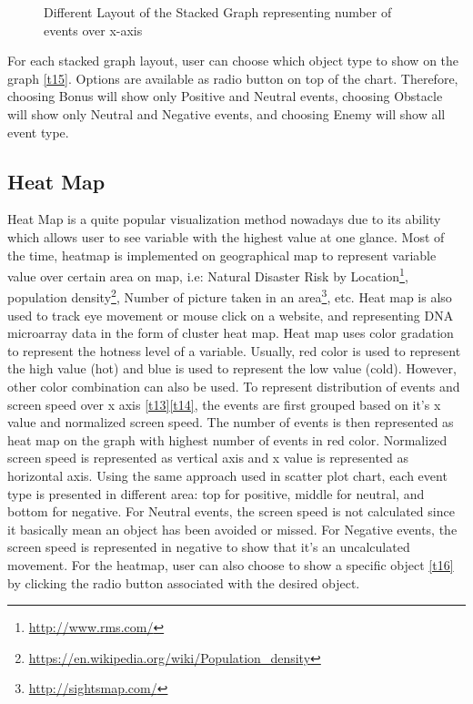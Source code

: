 \begin{figure}[htp] %
\centering
{}\hfil
{}

\hfil
{}

\caption{Different Layout of the Stacked Graph representing number of events over x-axis}
\end{figure}

For each stacked graph layout, user can choose which object type to show on the graph \ref{t15}. Options are available as radio button on top of the chart. Therefore, choosing Bonus will show only Positive and Neutral events, choosing Obstacle will show only Neutral and Negative events, and choosing Enemy will show all event type.

\subsection{Heat Map}
Heat Map is a quite popular visualization method nowadays due to its ability which allows user to see variable with the highest value at one glance. Most of the time, heatmap is implemented on geographical map to represent variable value over certain area on map, i.e: Natural Disaster Risk by Location\footnote{\url{http://www.rms.com/}}, population density\footnote{\url{https://en.wikipedia.org/wiki/Population_density}}, Number of picture taken in an area\footnote{\url{http://sightsmap.com/}}, etc. Heat map is also used to track eye movement or mouse click on a website, and representing DNA microarray data in the form of cluster heat map\cite{friendly}. Heat map uses color gradation to represent the hotness level of a variable. Usually, red color is used to represent the high value (hot) and blue is used to represent the low value (cold). However, other color combination can also be used. To represent distribution of events and screen speed over x axis \ref{t13}\ref{t14}, the events are first grouped based on it's x value and normalized screen speed. The number of events is then represented as heat map on the graph with highest number of events in red color. Normalized screen speed is represented as vertical axis and x value is represented as horizontal axis. Using the same approach used in scatter plot chart, each event type is presented in different area: top for positive, middle for neutral, and bottom for negative. For Neutral events, the screen speed is not calculated since it basically mean an object has been avoided or missed. For Negative events, the screen speed is represented in negative to show that it's an uncalculated movement. For the heatmap, user can also choose to show a specific object \ref{t16} by clicking the radio button associated with the desired object.


